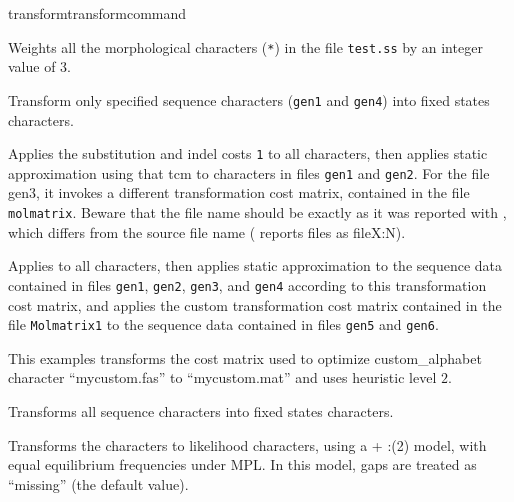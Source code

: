 \begin{command}{transform}{transformcommand}
\begin{poyexamples}


{Weights all the morphological characters (\texttt{*}) in the file \texttt{test.ss} by an
integer value of 3.}

{Transform only specified sequence characters (\texttt{gen1} and
\texttt{gen4}) into fixed states characters.}

{Applies the substitution and indel costs \texttt{1} to all characters, 
then applies static approximation using that tcm to characters in files 
\texttt{gen1} and \texttt{gen2}. For the file gen3, it invokes a different 
transformation cost matrix, contained in the file \texttt{molmatrix}. Beware 
that the file name should be exactly as it was reported with 
, which differs from the source
file name ( reports files as fileX:N).}

{Applies  to all characters, then applies
static approximation to the sequence data contained in files \texttt{gen1}, \texttt{gen2},
\texttt{gen3}, and \texttt{gen4} according to this transformation cost
matrix, and applies the custom transformation cost matrix contained in the file
\texttt{Molmatrix1} to the sequence data contained in files \texttt{gen5} and
\texttt{gen6}.}

{This examples transforms the cost matrix used to optimize custom\_alphabet 
character ``mycustom.fas'' to ``mycustom.mat'' and uses heuristic level $2$.}

{Transforms all sequence characters into fixed states characters.}

{Transforms the characters to likelihood characters, using a  
+ :(2) model, with equal equilibrium frequencies under 
MPL. In this model, gaps are treated as ``missing'' (the default value).}


\end{poyexamples}
\end{command}
